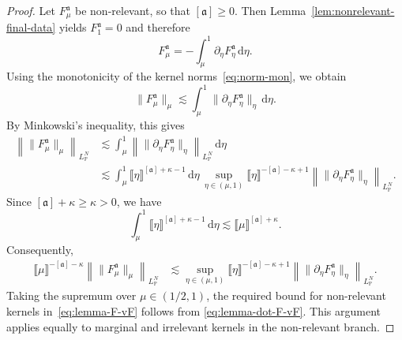 \documentclass{article}
\numberwithin{equation}{section}
\newcommand{\mathd}{\mathrm{d}}
\theoremstyle{plain}
\theoremstyle{definition}
\begin{document}
\begin{proof}
  Let $F^{\mathfrak{a}}_{\mu}$ be non-relevant, so that
  $[\mathfrak{a}] \geqslant 0$. Then
  Lemma~\ref{lem:nonrelevant-final-data} yields
  $F^{\mathfrak{a}}_1 = 0$ and therefore
  \[
    F^{\mathfrak{a}}_{\mu} = - \int_{\mu}^1
    \partial_{\eta} F^{\mathfrak{a}}_{\eta}\,\mathd \eta .
  \]
  Using the monotonicity of the kernel norms~\eqref{eq:norm-mon}, we obtain
  \[ \| F^{\mathfrak{a}}_{\mu} \|_{\mu} \lesssim \int_{\mu}^1 \| \partial_{\eta} F^{\mathfrak{a}}_{\eta} \|_{\eta}\,\mathd \eta . \] By Minkowski's inequality, this gives
  \[ 
  \begin{aligned} 
  	\left\| \| F^{\mathfrak{a}}_{\mu} \|_{\mu} \right\|_{L_{\mathbb P}^N} &\lesssim \int_{\mu}^1 \left\| \| \partial_{\eta} F^{\mathfrak{a}}_{\eta} \|_{\eta} \right\|_{L_{\mathbb P}^N} \,\mathd \eta \\ &\lesssim \int_{\mu}^1 \llbracket \eta \rrbracket^{[\mathfrak a]+\kappa-1} \,\mathd \eta\, \sup_{\eta\in(\mu,1)} \llbracket \eta \rrbracket^{-[\mathfrak a]-\kappa+1} \left\| \| \partial_{\eta} F^{\mathfrak{a}}_{\eta} \|_{\eta} \right\|_{L_{\mathbb P}^N}.
  	\end{aligned} 
  \]
  Since $[\mathfrak a]+\kappa\geqslant \kappa>0$, we have
  \[
    \int_{\mu}^1 \llbracket \eta \rrbracket^{[\mathfrak a]+\kappa-1}
    \,\mathd \eta \lesssim \llbracket \mu \rrbracket^{[\mathfrak a]+\kappa}.
  \]
  Consequently,
  \[
    \begin{aligned}
      \llbracket \mu \rrbracket^{-[\mathfrak a]-\kappa}
      \left\| \| F^{\mathfrak{a}}_{\mu} \|_{\mu} \right\|_{L_{\mathbb P}^N}
      &\lesssim \sup_{\eta\in(\mu,1)} \llbracket \eta
      \rrbracket^{-[\mathfrak a]-\kappa+1} \left\| \|
      \partial_{\eta} F^{\mathfrak{a}}_{\eta} \|_{\eta}
      \right\|_{L_{\mathbb P}^N}.
    \end{aligned}
  \]
  Taking the supremum over $\mu \in (1 / 2, 1)$, the required bound for
  non-relevant kernels in~\eqref{eq:lemma-F-vF} follows from
  \eqref{eq:lemma-dot-F-vF}. This argument applies equally to marginal and
  irrelevant kernels in the non-relevant branch.
  

\end{proof}
\end{document}
